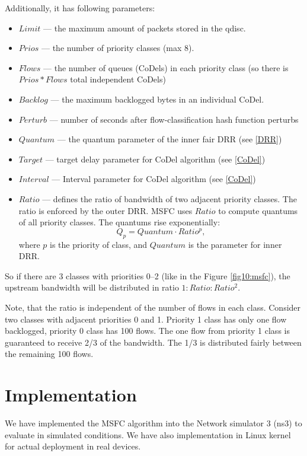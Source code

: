Additionally, it has following parameters:
\begin{itemize}
	\item $Limit$ --- the maximum amount of packets stored in the qdisc.
	\item $Prios$ --- the number of priority classes (max 8).
	\item $Flows$ --- the number of queues (CoDels) in each priority class (so there is $Prios*Flows$ total independent CoDels)
	\item $Backlog$ --- the maximum backlogged bytes in an individual CoDel.
	\item $Perturb$ --- number of seconds after flow-classification hash function perturbs
	\item $Quantum$ --- the quantum parameter of the inner fair DRR (see \ref{DRR})
	\item $Target$ --- target delay parameter for CoDel algorithm (see \ref{CoDel})
	\item $Interval$ --- Interval parameter for CoDel algorithm (see \ref{CoDel})
	\item $Ratio$ --- defines the ratio of bandwidth of two adjacent priority classes. The ratio is enforced by the outer DRR. MSFC uses $Ratio$ to compute quantums of all priority classes. The quantums rise exponentially:
	\[
	Q_p = Quantum \cdot Ratio^p,
	\]
	where $p$ is the priority of class, and $Quantum$ is the parameter for inner DRR.
\end{itemize}
So if there are 3 classes with priorities 0--2 (like in the Figure \ref{fig10:msfc}), the upstream bandwidth will be distributed in ratio $1:Ratio:Ratio^2$.

Note, that the ratio is independent of the number of flows in each class. Consider two classes with adjacent priorities 0 and 1. Priority 1 class has only one flow backlogged, priority 0 class has 100 flows. The one flow from priority 1 class is guaranteed to receive 2/3 of the bandwidth. The 1/3 is distributed fairly between the remaining 100 flows.


\section {Implementation}

We have implemented the MSFC algorithm into the Network simulator 3 (ns3) to evaluate in simulated conditions. We have also implementation in Linux kernel for actual deployment in real devices.

